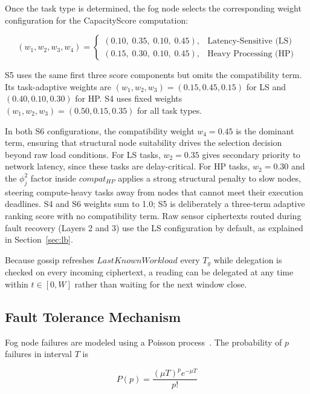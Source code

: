 \documentclass[conference]{IEEEtran}
\begin{document}
    Once the task type is determined, the fog node selects the corresponding weight configuration for the CapacityScore computation:

    \begin{equation}
    (w_1, w_2, w_3, w_4) =
    \begin{cases}
    (0.10,\; 0.35,\; 0.10,\; 0.45), & \text{Latency-Sensitive (LS)} \\
    (0.15,\; 0.30,\; 0.10,\; 0.45), & \text{Heavy Processing (HP)}
    \end{cases}
    \end{equation}

    S5 uses the same first three score components but omits the compatibility term. Its task-adaptive weights are $(w_1,w_2,w_3)=(0.15,0.45,0.15)$ for LS and $(0.40,0.10,0.30)$ for HP. S4 uses fixed weights $(w_1,w_2,w_3)=(0.50,0.15,0.35)$ for all task types.

    In both S6 configurations, the compatibility weight $w_4 = 0.45$ is the dominant term, ensuring that structural node suitability drives the selection decision beyond raw load conditions. For LS tasks, $w_2 = 0.35$ gives secondary priority to network latency, since these tasks are delay-critical. For HP tasks, $w_2 = 0.30$ and the $\phi_j^2$ factor inside $compat_{HP}$ applies a strong structural penalty to slow nodes, steering compute-heavy tasks away from nodes that cannot meet their execution deadlines. S4 and S6 weights sum to 1.0; S5 is deliberately a three-term adaptive ranking score with no compatibility term. Raw sensor ciphertexts routed during fault recovery (Layers 2 and 3) use the LS configuration by default, as explained in Section~\ref{sec:lb}.

    Because gossip refreshes $LastKnownWorkload$ every $T_g$ while delegation is checked on every incoming ciphertext, a reading can be delegated at any time within $t\in[0,W]$ rather than waiting for the next window close.

    \subsection{Fault Tolerance Mechanism}
    Fog node failures are modeled using a Poisson process~\cite{abdelbasset2019fault}. The probability of $p$ failures in interval $T$ is

    \begin{equation}
    P(p) = \frac{(\mu T)^p e^{-\mu T}}{p!}
    \end{equation}
\end{document}
